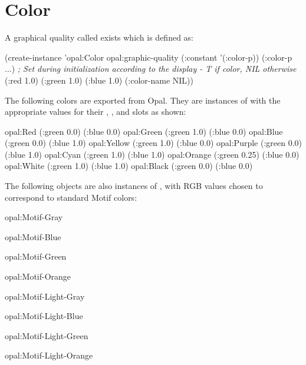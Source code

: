 \section{Color}

A graphical quality called  exists which
is defined as:

\vspace{.5 line}
  
\begin{programexample}
(create-instance 'opal:Color opal:graphic-quality
   (:constant '(:color-p))
   (:color-p ...)  {\it ; Set during initialization according to the display - T if color, NIL otherwise}
   (:red 1.0)
   (:green 1.0)
   (:blue 1.0)
   (:color-name NIL))
\end{programexample}

The following colors are exported from Opal.  They are instances of
 with the appropriate values for their , ,
and  slots as shown:

   
 
  
\vspace{.5 line}
\begin{example}
opal:Red       (:green 0.0)  (:blue 0.0)
opal:Green     (:green 1.0)  (:blue 0.0)
opal:Blue      (:green 0.0)  (:blue 1.0)
opal:Yellow    (:green 1.0)  (:blue 0.0)
opal:Purple    (:green 0.0)  (:blue 1.0)
opal:Cyan      (:green 1.0)  (:blue 1.0)
opal:Orange   (:green 0.25) (:blue 0.0)
opal:White     (:green 1.0)  (:blue 1.0)
opal:Black     (:green 0.0)  (:blue 0.0)
\end{example}

The following objects are also instances of , with RGB values
chosen to correspond to standard Motif colors:

\vspace{.5 line}
\begin{text}
opal:Motif-Gray

opal:Motif-Blue

opal:Motif-Green

opal:Motif-Orange

opal:Motif-Light-Gray

opal:Motif-Light-Blue

opal:Motif-Light-Green

opal:Motif-Light-Orange
\end{text}
\vspace{1 line}


